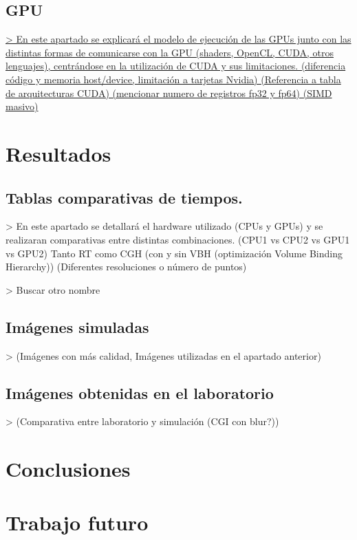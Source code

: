 \documentclass[10pt, a4paper]{article}
\begin{document}
\subsection{GPU}

\underline{> En este apartado se explicará el modelo de ejecución de las GPUs junto con las distintas formas de comunicarse con la GPU (shaders, OpenCL, CUDA, otros lenguajes), centrándose en la utilización de CUDA y sus limitaciones. (diferencia código y memoria host/device, limitación a tarjetas Nvidia) (Referencia a tabla de arquitecturas CUDA) (mencionar numero de registros fp32 y fp64) (SIMD masivo)}



\section{Resultados}

\subsection{Tablas comparativas de tiempos.}

> En este apartado se detallará el hardware utilizado (CPUs y GPUs) y se realizaran comparativas entre distintas combinaciones. (CPU1 vs CPU2 vs GPU1 vs GPU2) Tanto RT como CGH (con y sin VBH (optimización Volume Binding Hierarchy)) (Diferentes resoluciones o número de puntos)

> Buscar otro nombre

\subsection{Imágenes simuladas}

> (Imágenes con más calidad, Imágenes utilizadas en el apartado anterior)

\subsection{Imágenes obtenidas en el laboratorio}

> (Comparativa entre laboratorio y simulación (CGI con blur?))

\section{Conclusiones}

\section{Trabajo futuro}
\end{document}
